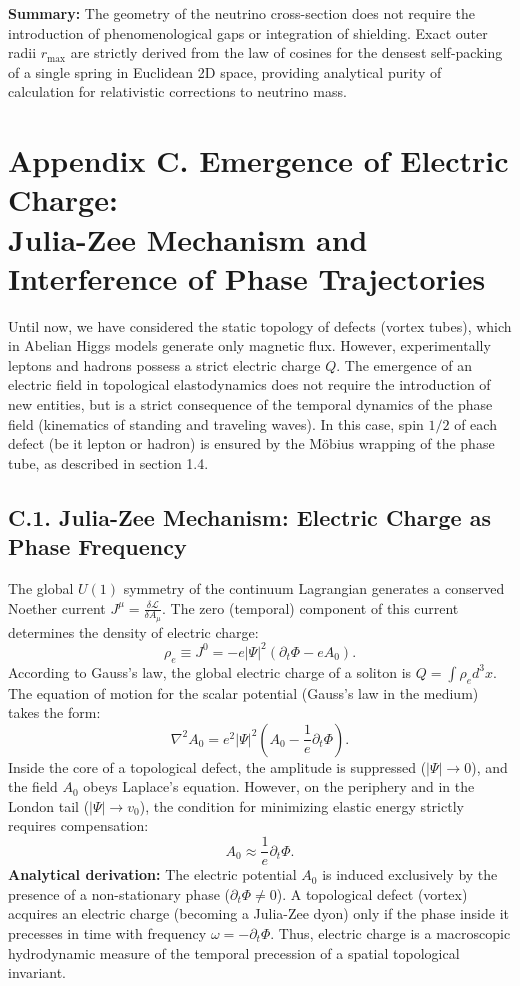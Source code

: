 \documentclass[11pt,a4paper]{article}
\begin{document}
	\textbf{Summary:} The geometry of the neutrino cross-section does not require the introduction of phenomenological gaps or integration of shielding. Exact outer radii $r_{\text{max}}$ are strictly derived from the law of cosines for the densest self-packing of a single spring in Euclidean 2D space, providing analytical purity of calculation for relativistic corrections to neutrino mass.

\section*{Appendix C. Emergence of Electric Charge:\\ Julia-Zee Mechanism and Interference of Phase Trajectories}

Until now, we have considered the static topology of defects (vortex tubes), which in Abelian Higgs models generate only magnetic flux. However, experimentally leptons and hadrons possess a strict electric charge $Q$. The emergence of an electric field in topological elastodynamics does not require the introduction of new entities, but is a strict consequence of the temporal dynamics of the phase field (kinematics of standing and traveling waves). In this case, spin $1/2$ of each defect (be it lepton or hadron) is ensured by the Möbius wrapping of the phase tube, as described in section 1.4.

\subsection*{C.1. Julia-Zee Mechanism: Electric Charge as Phase Frequency}
The global $U(1)$ symmetry of the continuum Lagrangian generates a conserved Noether current $J^\mu = \frac{\delta \mathcal{L}}{\delta A_\mu}$. The zero (temporal) component of this current determines the density of electric charge:
\begin{equation}
	\rho_e \equiv J^0 = -e |\Psi|^2 (\partial_t \Phi - e A_0).
\end{equation}
According to Gauss's law, the global electric charge of a soliton is $Q = \int \rho_e d^3x$. The equation of motion for the scalar potential (Gauss's law in the medium) takes the form:
\begin{equation}
	\nabla^2 A_0 = e^2 |\Psi|^2 (A_0 - \frac{1}{e}\partial_t \Phi).
\end{equation}
Inside the core of a topological defect, the amplitude is suppressed ($|\Psi| \to 0$), and the field $A_0$ obeys Laplace's equation. However, on the periphery and in the London tail ($|\Psi| \to v_0$), the condition for minimizing elastic energy strictly requires compensation:
\begin{equation}
	A_0 \approx \frac{1}{e} \partial_t \Phi.
\end{equation}
\textbf{Analytical derivation:} The electric potential $A_0$ is induced exclusively by the presence of a non-stationary phase ($\partial_t \Phi \neq 0$). A topological defect (vortex) acquires an electric charge (becoming a Julia-Zee dyon) only if the phase inside it precesses in time with frequency $\omega = -\partial_t \Phi$. Thus, electric charge is a macroscopic hydrodynamic measure of the temporal precession of a spatial topological invariant.
\end{document}
